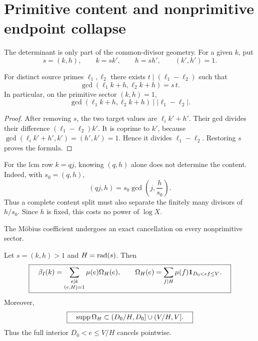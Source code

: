 \section{Primitive content and nonprimitive endpoint collapse}
\label{sec:content}

The determinant is only part of the common-divisor geometry.  For a
given $k$, put
\begin{equation}
 s=(k,h),\qquad k=sk',\qquad h=sh',\qquad(k',h')=1.
 \label{eq:content-decomposition}
\end{equation}

\begin{proposition}
\label{prop:target-gcd}
For distinct source primes $\ell_1,\ell_2$ there exists
$t\mid(\ell_1-\ell_2)$ such that
\begin{equation}
 \gcd(\ell_1k+h,\ell_2k+h)=s\,t.
 \label{eq:target-gcd}
\end{equation}
In particular, on the primitive sector $(k,h)=1$,
\begin{equation}
 \gcd(\ell_1k+h,\ell_2k+h)\mid|\ell_1-\ell_2|.
 \label{eq:primitive-target-gcd}
\end{equation}
\end{proposition}

\begin{proof}
After removing $s$, the two target values are
$\ell_i k'+h'$.  Their gcd divides their difference
$(\ell_1-\ell_2)k'$.  It is coprime to $k'$, because
$\gcd(\ell_i k'+h',k')=(h',k')=1$.  Hence it divides
$\ell_1-\ell_2$.  Restoring $s$ proves the formula.
\end{proof}

For the lcm row $k=qj$, knowing $(q,h)$ alone does not determine the
content.  Indeed, with $s_0=(q,h)$,
\begin{equation}
 (qj,h)=s_0\gcd\!\left(j,\frac h{s_0}\right).
 \label{eq:qj-content}
\end{equation}
Thus a complete content split must also separate the finitely many
divisors of $h/s_0$.  Since $h$ is fixed, this costs no power of
$\log X$.

The M\"obius coefficient undergoes an exact cancellation on every
nonprimitive sector.

\begin{theorem}
\label{thm:endpoint-collapse}
Let $s=(k,h)>1$ and $H=\operatorname{rad}(s)$.  Then
\begin{equation}
 \boxed{\quad
 \beta_I(k)=
 \sum_{\substack{e\mid k\\(e,H)=1}}\mu(e)\Omega_H(e),
 \qquad
 \Omega_H(e)=\sum_{f\mid H}\mu(f)
 \mathbf 1_{D_0<ef\le V}.
 \quad}
 \label{eq:endpoint-collapse}
\end{equation}
Moreover,
\begin{equation}
 \boxed{\quad
 \operatorname{supp}\Omega_H\subset
 (D_0/H,D_0]\cup(V/H,V].
 \quad}
 \label{eq:endpoint-support}
\end{equation}
Thus the full interior $D_0<e\le V/H$ cancels pointwise.
\end{theorem}

